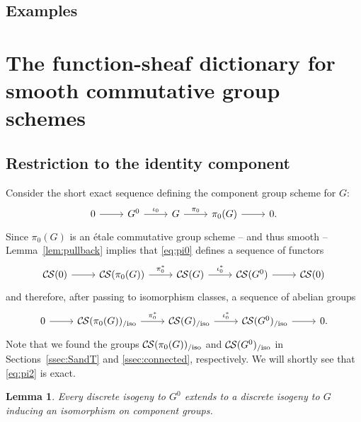 \documentclass[10pt]{amsart}
\theoremstyle{plain}
\newtheorem{lemma}[theorem]{Lemma}
\theoremstyle{definition}
\theoremstyle{remark}
\newcommand{\CS}{{\mathcal{C\hskip-0.8pt S}}}
\newcommand{\CSiso}[1]{\CS(#1)_{/\text{iso}}}
\begin{document}
\subsection{Examples}

\section{The function-sheaf dictionary for smooth commutative group schemes}\label{sec:main}


\subsection{Restriction to the identity component} \label{ssec:restriction}

Consider the short exact sequence
defining the component group scheme for $G$:
\begin{equation}\label{eq:pi0}
\begin{tikzcd}
0 \rar & G^0 \arrow{r}{\iota_0} & G \arrow{r}{\pi_0} & \pi_0(G) \rar & 0.
\end{tikzcd}
\end{equation}
Since $\pi_0(G)$ is an \'etale commutative group scheme -- and thus smooth --
Lemma~\ref{lem:pullback} implies that \eqref{eq:pi0} defines a sequence of functors
\begin{equation}\label{eq:pi1}
\begin{tikzcd}
\CS(0) \rar & \CS(\pi_0(G)) \arrow{r}{\pi_0^*} & \CS(G) \arrow{r}{\iota_0^*} & \CS(G^0) \rar & \CS(0)
\end{tikzcd}
\end{equation}
and therefore, after passing to isomorphism classes, a sequence of abelian groups
\begin{equation}\label{eq:pi2}
\begin{tikzcd}
0 \rar &
\CSiso{\pi_0(G)} \arrow{r}{\pi_0^*} & \CSiso{G} \arrow{r}{\iota_0^*} & \CSiso{G^0} \rar & 0.
\end{tikzcd}
\end{equation}
 Note that we found the groups $\CSiso{\pi_0(G)}$ and $\CSiso{G^0}$
in Sections~\ref{ssec:SandT} and \ref{ssec:connected}, respectively.
We will shortly see that \eqref{eq:pi2} is exact.


\begin{lemma}\label{lemma:ext}
Every discrete isogeny to $G^0$ extends to a discrete
isogeny to $G$ inducing an isomorphism on component groups.
\end{lemma}
\end{document}
